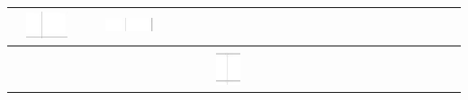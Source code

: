 \documentclass[10pt]{article}
\begin{document}
\begin{center}
\begin{tabular}{|c|c|c|c|c|c|c|c|c|c|c|c|c|c|c|c|c|c|c|c|c|c|c|c|c|c|c|}
 & \includegraphics[max width=\textwidth]{2024_11_21_d51d653f4fe4a5bb0c33g-15(8)}
 &  &  & \includegraphics[max width=\textwidth]{2024_11_21_d51d653f4fe4a5bb0c33g-15(6)}
 &  \\
\hline
 &  &  &  &  &  &  &  &  &  &  &  &  &  &  &  &  &  &  &  &  &  &  &  &  &  &  \\
\hline
 &  &  &  &  &  &  &  &  & \includegraphics[max width=\textwidth]{2024_11_21_d51d653f4fe4a5bb0c33g-15(11)}

\end{tabular}
\end{center}
\end{document}
